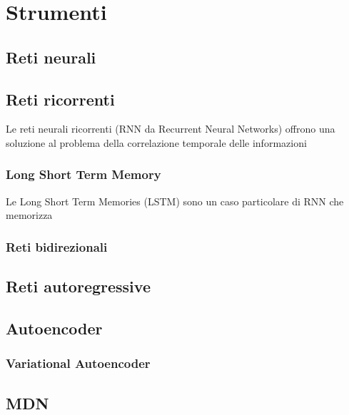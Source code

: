 \chapter{Strumenti}
\section{Reti neurali}
\section{Reti ricorrenti}
Le reti neurali ricorrenti (RNN da Recurrent Neural Networks) offrono una soluzione 
al problema della correlazione temporale delle informazioni
\subsection{Long Short Term Memory}
Le Long Short Term Memories (LSTM) sono un caso particolare di RNN che memorizza
\subsection{Reti bidirezionali}
\section{Reti autoregressive}
\section{Autoencoder}
\subsection{Variational Autoencoder}
\section{MDN}
